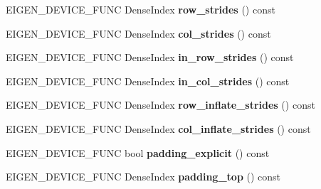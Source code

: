 \begin{DoxyCompactItemize}
E\+I\+G\+E\+N\+\_\+\+D\+E\+V\+I\+C\+E\+\_\+\+F\+U\+NC Dense\+Index {\bfseries row\+\_\+strides} () const
\item 
\mbox{\label{class_eigen_1_1_tensor_image_patch_op_a303f255d460937a50f6a62fe25df980a}} 
E\+I\+G\+E\+N\+\_\+\+D\+E\+V\+I\+C\+E\+\_\+\+F\+U\+NC Dense\+Index {\bfseries col\+\_\+strides} () const
\item 
\mbox{\label{class_eigen_1_1_tensor_image_patch_op_a1d4af257f268bf707e5726c565e5f54f}} 
E\+I\+G\+E\+N\+\_\+\+D\+E\+V\+I\+C\+E\+\_\+\+F\+U\+NC Dense\+Index {\bfseries in\+\_\+row\+\_\+strides} () const
\item 
\mbox{\label{class_eigen_1_1_tensor_image_patch_op_a29f8ede4722808727b9b6c6ebad0e3d4}} 
E\+I\+G\+E\+N\+\_\+\+D\+E\+V\+I\+C\+E\+\_\+\+F\+U\+NC Dense\+Index {\bfseries in\+\_\+col\+\_\+strides} () const
\item 
\mbox{\label{class_eigen_1_1_tensor_image_patch_op_a86008f8a3273640025e7c5de34f62bdb}} 
E\+I\+G\+E\+N\+\_\+\+D\+E\+V\+I\+C\+E\+\_\+\+F\+U\+NC Dense\+Index {\bfseries row\+\_\+inflate\+\_\+strides} () const
\item 
\mbox{\label{class_eigen_1_1_tensor_image_patch_op_a2e7b7d2594720f63e09d67426c346e13}} 
E\+I\+G\+E\+N\+\_\+\+D\+E\+V\+I\+C\+E\+\_\+\+F\+U\+NC Dense\+Index {\bfseries col\+\_\+inflate\+\_\+strides} () const
\item 
\mbox{\label{class_eigen_1_1_tensor_image_patch_op_a7ce12cc1ce9c1937a2f041a2c2cd7b94}} 
E\+I\+G\+E\+N\+\_\+\+D\+E\+V\+I\+C\+E\+\_\+\+F\+U\+NC bool {\bfseries padding\+\_\+explicit} () const
\item 
\mbox{\label{class_eigen_1_1_tensor_image_patch_op_a42e6346cc118e9b9ff53e318a8715453}} 
E\+I\+G\+E\+N\+\_\+\+D\+E\+V\+I\+C\+E\+\_\+\+F\+U\+NC Dense\+Index {\bfseries padding\+\_\+top} () const
\item 
\mbox{\label{class_eigen_1_1_tensor_image_patch_op_ae9efac5a56b67bfac51d81f0c2cef392}} 

\end{DoxyCompactItemize}
